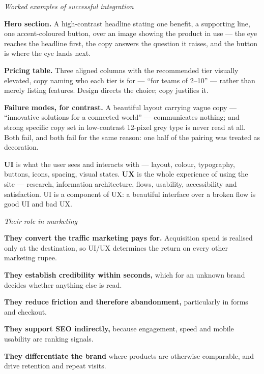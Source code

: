 \begin{qlist}
\textit{Worked examples of successful integration}
\begin{apts}\setcounter{enumi}{7}
\item \textbf{Hero section.} A high-contrast headline stating one benefit, a
      supporting line, one accent-coloured button, over an image showing the
      product in use --- the eye reaches the headline first, the copy answers the
      question it raises, and the button is where the eye lands next.
\item \textbf{Pricing table.} Three aligned columns with the recommended tier
      visually elevated, copy naming who each tier is for --- ``for teams of
      2--10'' --- rather than merely listing features. Design directs the choice;
      copy justifies it.
\item \textbf{Failure modes, for contrast.} A beautiful layout carrying vague
      copy --- ``innovative solutions for a connected world'' --- communicates
      nothing; and strong specific copy set in low-contrast 12-pixel grey type
      is never read at all. Both fail, and both fail for the same reason: one
      half of the pairing was treated as decoration.
\end{apts}

\textbf{UI} is what the user sees and interacts with --- layout, colour,
typography, buttons, icons, spacing, visual states. \textbf{UX} is the whole
experience of using the site --- research, information architecture, flows,
usability, accessibility and satisfaction. UI is a component of UX: a beautiful
interface over a broken flow is good UI and bad UX.

\textit{Their role in marketing}
\begin{apts}
\item \textbf{They convert the traffic marketing pays for.} Acquisition spend is
      realised only at the destination, so UI/UX determines the return on every
      other marketing rupee.
\item \textbf{They establish credibility within seconds,} which for an unknown
      brand decides whether anything else is read.
\item \textbf{They reduce friction and therefore abandonment,} particularly in
      forms and checkout.
\item \textbf{They support SEO indirectly,} because engagement, speed and mobile
      usability are ranking signals.
\item \textbf{They differentiate the brand} where products are otherwise
      comparable, and drive retention and repeat visits.
\end{apts}


\end{qlist}
